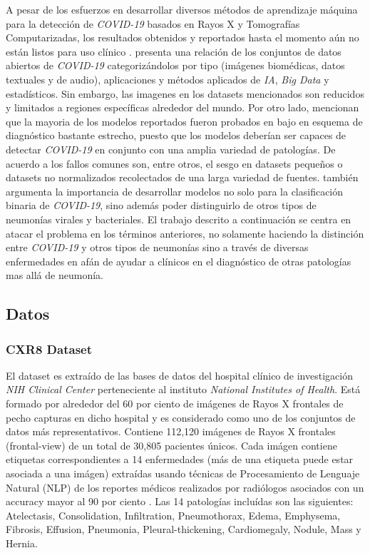 A pesar de los esfuerzos en desarrollar diversos métodos de aprendizaje máquina para la detección de
\textit{COVID-19} basados en Rayos X y Tomografías Computarizadas, los resultados obtenidos y
reportados hasta el momento aún no están listos para uso clínico \cite{roberts2021common}.
\citeauthor{shuja2021covid} presenta una relación de los conjuntos de datos abiertos de
\textit{COVID-19} categorizándolos por tipo (imágenes biomédicas,
datos textuales y de audio), aplicaciones y métodos aplicados de \textit{IA}, \textit{Big Data} y
estadísticos. Sin embargo, las imagenes en los datasets mencionados son reducidos y limitados a
regiones específicas alrededor del mundo. Por otro lado, \citeauthor{greenspan2020position} mencionan
que la mayoria de los modelos reportados fueron probados en bajo en esquema de diagnóstico bastante
estrecho, puesto que los modelos deberían ser capaces de detectar \textit{COVID-19} en conjunto
con una amplia variedad de patologías. De acuerdo a \citeauthor{roberts2021common} los fallos comunes
son, entre otros, el sesgo en datasets pequeños o datasets no normalizados recolectados de una larga
variedad de fuentes. \citeauthor{roberts2021common} también argumenta la importancia de desarrollar
modelos no solo para la clasificación binaria de \textit{COVID-19}, sino además poder distinguirlo
de otros tipos de neumonías virales y bacteriales. El trabajo descrito a continuación se centra en
atacar el problema en los términos anteriores, no solamente haciendo la distinción entre
\textit{COVID-19} y otros tipos de neumonías sino a través de diversas enfermedades en afán de ayudar
a clínicos en el diagnóstico de otras patologías mas allá de neumonía.


\subsection{Datos}

\subsubsection{CXR8 Dataset}

El dataset es extraído de las bases de datos del hospital clínico de investigación \textit{NIH
Clinical Center} perteneciente al instituto \textit{National Institutes of Health}. Está formado por
alrededor del 60 por ciento de imágenes de Rayos X frontales de pecho capturas en dicho hospital y
es considerado como uno de los conjuntos de datos más representativos. Contiene
112,120 imágenes de Rayos X frontales (frontal-view) de un total de 30,805 pacientes únicos. Cada
imágen contiene etiquetas correspondientes a 14 enfermedades (más de una etiqueta puede estar
asociada a una imágen) extraídas usando técnicas de
Procesamiento de Lenguaje Natural (NLP) de los reportes médicos realizados por radiólogos asociados
con un accuracy mayor al 90 por ciento \cite{8099852}. Las 14 patologías incluídas son las
siguientes: Atelectasis, Consolidation, Infiltration, Pneumothorax, Edema, Emphysema, Fibrosis,
Effusion, Pneumonia, Pleural-thickening, Cardiomegaly, Nodule, Mass y Hernia.

